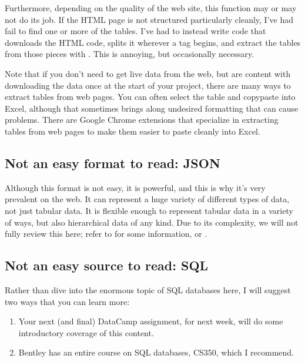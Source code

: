 \documentclass[letterpaper,10pt,english]{jupyterBook}
\begin{document}
\sphinxAtStartPar
Furthermore, depending on the quality of the web site, this function may or may not do its job.  If the HTML page is not structured particularly cleanly, I’ve had  fail to find one or more of the tables.  I’ve had to instead write code that downloads the HTML code, splits it wherever a  tag begins, and extract the tables from those pieces with .  This is annoying, but occasionally necessary.

\sphinxAtStartPar
Note that if you don’t need to get live data from the web, but are content with downloading the data once at the start of your project, there are many ways to extract tables from web pages.  You can often select the table and copy\sphinxhyphen{}paste into Excel, although that sometimes brings along undesired formatting that can cause problems.  There are Google Chrome extensions that specialize in extracting tables from web pages to make them easier to paste cleanly into Excel.


\subsection{Not an easy format to read: JSON}
\label{\detokenize{chapter-13-etl:not-an-easy-format-to-read-json}}
\sphinxAtStartPar
Although this format is not easy, it is powerful, and this is why it’s very prevalent on the web.  It can represent a huge variety of different types of data, not just tabular data.  It is flexible enough to represent tabular data in a variety of ways, but also hierarchical data of any kind.  Due to its complexity, we will not fully review this here; refer to  for some information, or .


\subsection{Not an easy source to read: SQL}
\label{\detokenize{chapter-13-etl:not-an-easy-source-to-read-sql}}
\sphinxAtStartPar
Rather than dive into the enormous topic of SQL databases here, I will suggest two ways that you can learn more:
\begin{enumerate}
%
\item {} 
\sphinxAtStartPar
Your next (and final) DataCamp assignment, for next week, will do some introductory coverage of this content.

\item {} 
\sphinxAtStartPar
Bentley has an entire course on SQL databases, CS350, which I recommend.

\end{enumerate}
\end{document}
